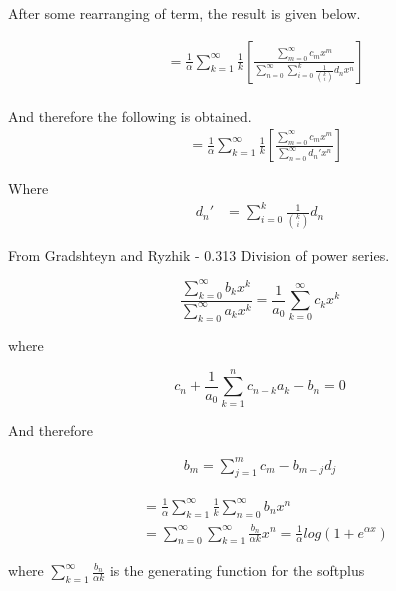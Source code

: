 After some rearranging of term, the result is given below.

\begin{align*}
	& = \frac{1}{\alpha}\sum\limits_{k=1}^{\infty}\frac{1}{k}\left[ \frac{\sum\limits_{m=0}^{\infty}c_{m}x^{m}}{\sum\limits_{n=0}^{\infty}\sum\limits_{i=0}^{k}\frac{1}{{k \choose i}}d_{n}x^{n}} \right] \\
\end{align*}

And therefore the following is obtained. 
\begin{align*}
	& = \frac{1}{\alpha}\sum\limits_{k=1}^{\infty}\frac{1}{k}\left[ \frac{\sum\limits_{m=0}^{\infty}c_{m}x^{m}}{\sum\limits_{n=0}^{\infty}d_{n}'x^{n}} \right]
\end{align*}

Where
\begin{align*}
 	d_{n}' & = \sum\limits_{i=0}^{k}\frac{1}{{k \choose i}}d_{n}
\end{align*}

From Gradshteyn and Ryzhik - 0.313 Division of power series.

\begin{equation}
	\frac{\sum\limits_{k=0}^{\infty}b_k x^k}{\sum\limits_{k=0}^{\infty}a_k x^k} 
	= \frac{1}{a_0}\sum\limits_{k=0}^{\infty}c_kx^k
\end{equation}

where

\begin{equation}
	c_n + \frac{1}{a_0}\sum\limits_{k=1}^n c_{n-k}a_k - b_n = 0
\end{equation}

And therefore

\begin{align*}
	b_{m} = \sum\limits_{j=1}^{m}c_{m}-b_{m-j}d_{j}
\end{align*}

\begin{align*}
	& = \frac{1}{\alpha}\sum\limits_{k=1}^{\infty}\frac{1}{k}\sum\limits_{n=0}^{\infty}b_{n}x^{n} \\
	& = \sum\limits_{n=0}^{\infty}\sum\limits_{k=1}^{\infty}\frac{b_{n}}{\alpha k}x^{n}=\frac{1}{\alpha}log(1+e^{\alpha x})
\end{align*}

where $\sum\limits_{k=1}^{\infty}\frac{b_{n}}{\alpha k}$ is the generating function for the softplus

